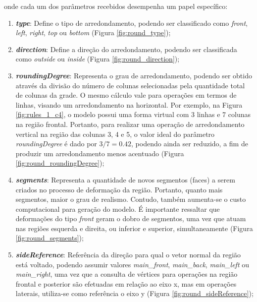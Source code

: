 \noindent onde cada um dos parâmetros recebidos desempenha um papel específico:

\vspace{0.3cm}

\begin{enumerate}
    \item \label{itm:type} \textbf{\textit{type}}: Define o tipo de arredondamento, podendo ser classificado como \textit{front}, \textit{left}, \textit{right}, \textit{top} ou \textit{bottom} (Figura \ref{fig:round_type});
    
    \item \label{itm:direction} \textbf{\textit{direction}}: Define a direção do arredondamento, podendo ser classificada como \textit{outside} ou \textit{inside} (Figura \ref{fig:round_direction});
    
    \item \label{itm:roundingDegree} \textbf{\textit{roundingDegree}}: Representa o grau de arredondamento, podendo ser obtido através da divisão do número de colunas selecionadas pela quantidade total de colunas da grade. O mesmo cálculo vale para operações em termos de linhas, visando um arredondamento na horizontal. Por exemplo, na Figura \ref{fig:rules_1_c4}, o modelo possui uma forma virtual com 3 linhas e 7 colunas na região frontal. Portanto, para realizar uma operação de arredondamento vertical na região das colunas 3, 4 e 5, o valor ideal do parâmetro \textit{roundingDegree} é dado por $3/7=0.42$, podendo ainda ser reduzido, a fim de produzir um arredondamento menos acentuado (Figura \ref{fig:round_roundingDegree});
    
    \item \label{itm:segments} \textbf{\textit{segments}}: Representa a quantidade de novos segmentos (faces) a serem criados no processo de deformação da região. Portanto, quanto mais segmentos, maior o grau de realismo. Contudo, também aumenta-se o custo computacional para geração do modelo. É importante ressaltar que deformações do tipo \textit{front} geram o dobro de segmentos, uma vez que atuam nas regiões esquerda e direita, ou inferior e superior, simultaneamente (Figura \ref{fig:round_segments});
    
    \item \label{itm:sideReference} \textbf{\textit{sideReference}}: Referência da direção para qual o vetor normal da região está voltado, podendo assumir valores \textit{main\_front}, \textit{main\_back}, \textit{main\_left} ou \textit{main\_right}, uma vez que a consulta de vértices para operações na região frontal e posterior são efetuadas em relação ao eixo x, mas em operações laterais, utiliza-se como referência o eixo y (Figura \ref{fig:round_sideReference});
    

\end{enumerate}
